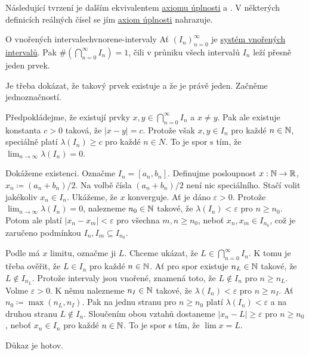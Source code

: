 Následující tvrzení je dalším ekvivalentem \hyperref[prop:axiom-uplnosti]{axiomu
úplnosti} a . V některých definicích reálných
čísel se jím \hyperref[prop:axiom-uplnosti]{axiom úplnosti} nahrazuje.

\begin{proposition}{O vnořených intervalech}{vnorene-intervaly}
 Ať $(I_n)_{n=0}^{\infty}$ je \hyperref[def:system-vnorenych-intervalu]{systém
 vnořených intervalů}. Pak $\# (\bigcap_{n=0}^{\infty} I_n) = 1$, čili v průniku
 všech intervalů $I_n$ leží přesně jeden prvek.
\end{proposition}
\begin{propproof}
 Je třeba dokázat, že takový prvek existuje a že je právě jeden. Začněme
 jednoznačností.

 Předpokládejme, že existují prvky $x,y \in \bigcap_{n=0}^{\infty} I_n$ a $x
 \neq y$. Pak ale existuje konstanta $c>0$ taková, že $|x-y| = c$. Protože však
 $x,y \in I_n$ pro každé $n \in \mathbb{N}$, speciálně platí $\lambda(I_n) \geq c$ pro
 každé $n \in N$. To je spor s tím, že $\lim_{n \to \infty} \lambda(I_n) = 0$.

 Dokážeme existenci. Označme $I_n = [a_n,b_n]$. Definujme posloupnost $x:\mathbb{N} \to
 \mathbb{R}$, $x_n \coloneqq (a_n + b_n) / 2$. Na volbě čísla $(a_n + b_n) / 2$ není nic
 speciálního. Stačí volit jakékoliv $x_n \in I_n$. Ukážeme, že $x$ konverguje.
 Ať je dáno $\varepsilon>0$. Protože $\lim_{n \to \infty} \lambda(I_n) = 0$,
 nalezneme $n_0 \in \mathbb{N}$ takové, že $\lambda(I_n)<\varepsilon$ pro $n \geq n_0$.
 Potom ale platí $|x_n-x_m|<\varepsilon$ pro všechna $m,n \geq n_0$, neboť
 $x_n,x_m \in I_{n_0}$, což je zaručeno podmínkou $I_n,I_m \subseteq I_{n_0}$.

 Podle  má $x$ limitu, označme ji $L$. Chceme
 ukázat, že $L \in \bigcap_{n=0}^{\infty}I_n$. K tomu je třeba ověřit, že $L \in
 I_n$ pro každé $n \in \mathbb{N}$. Ať pro spor existuje $n_L \in \mathbb{N}$ takové, že $L
 \notin I_{n_L}$. Protože intervaly jsou vnořené, znamená toto, že $L \notin
 I_n$ pro $n \geq n_L$. Volme $\varepsilon>0$. K němu nalezneme $n_I \in \mathbb{N}$
 takové, že $\lambda(I_n)<\varepsilon$ pro $n \geq n_I$. Ať $n_0 \coloneqq
 \max(n_L,n_I)$. Pak na jednu stranu pro $n \geq n_0$ platí
 $\lambda(I_n)<\varepsilon$ a na druhou stranu $L \notin I_n$. Sloučením obou
 vztahů dostaneme $|x_n-L| \geq \varepsilon$ pro $n \geq n_0$, neboť $x_n \in
 I_n$ pro každé $n \in \mathbb{N}$. To je spor s tím, že $\lim x = L$.

 Důkaz je hotov.
\end{propproof}

